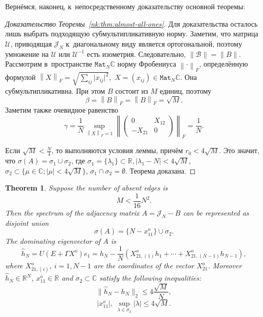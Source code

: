 \documentclass[14pt,a4paper]{extarticle}
\newtheorem{thm}{Theorem}
\theoremstyle{definition}
\begin{document}
Верн\"емся, наконец, к~непосредственному доказательству основной теоремы:
\begin{proof}[Доказательство Теоремы~\ref{nk:thm:almost-all-ones}]
    Для доказательства осталось лишь выбрать подходящую субмультипликативную норму.
    Заметим, что матрица \( \mathcal{U} \),
    приводящая \( \mathcal{J}_N \) к~диагональному виду
    является ортогональной,
    поэтому умножение на \( \mathcal{U} \) или \(\mathcal{U}^{-1}\)
    есть изометрия.
    Следовательно, \( \|\mathcal{B}\|=\|B\| \).
    Рассмотрим в~пространстве \( \mathtt{Mat}_{N}\mathbb{C} \)
    норму Фробениуса \( {\left\|\cdot\right\|}_{F} \),
    определ\"енную формулой
    \( {\left\|X\right\|}_{F} = \sqrt{\sum_{ij} \lvert x_{ij}\rvert^2}, \)
    \( X = (x_{ij})\in\mathtt{Mat}_N\mathbb{C} \).
    Она субмультипликативна.
    При этом
    \( B \) состоит из \( M \) единиц, поэтому
    \[
        \beta = {\left\|B\right\|}_{F} =
        {\left\|B\right\|}_{F} = \sqrt{M}.
        \]
    Заметим также очевидное равенство
    \[
        \gamma = \frac1N
                \sup_{{\left\|X\right\|}_{F}=1}{\left\|\begin{pmatrix}0 & X_{12} \\ -X_{21} & 0\end{pmatrix}\right\|}_{F}
                = \frac1N. \]
    
    Если
     \( \sqrt{M} < \frac{N}{4} \),
     то выполняются условия леммы,
     прич\"ем \( r_0 < 4\sqrt{M} \).
    Это значит, что
     \( \sigma(A) = \sigma_1 \cup \sigma_2 \),
     где \( \sigma_1 = \{ \lambda_1 \}\subset\mathbb{R}, \lvert \lambda_1 - N \rvert < 4\sqrt{M} \),
     \( \sigma_2 \subset \{ \mu\in\mathbb{C}; \lvert\mu\rvert < 4\sqrt{M} \} \),
     \( \sigma_1 \cap \sigma_2 = \emptyset \).
    Теорема доказана.
    \end{proof}

\begin{thm}
    Suppose the number of absent edges is
    \[ M < \frac{1}{16} N^2. \]
    Then the spectrum of the adjacency matrix \( A = \mathcal{J}_N - B \)
        can be represented as disjoint union
    \[
        \sigma(A) = \{ N - x_{11}^o \} \cup \sigma_2.
    \]
    The dominating eigenvector of \( A \) is
    \[
        \hat{h}_N = U(E+\Gamma X^o) e_1 =
            h_N - \frac1N (X_{21,(1)}^o h_1 + \cdots + X_{21, (N{-}1)}^o h_{N{-}1}),
    \]
    where \( X_{21,(i)}^o,\ i=\overline{1,N{-}1} \) are the coordinates
    of the vector \( X_{21}^o \).
    Moreover \( \hat{h}_N\in\mathbb{R}^{N} \),
    \( x_{11}^o\in\mathbb{R} \) and \( \sigma_2\subset\mathbb{C} \)
    satisfy the following inequalities:
    \[
        \|\hat{h}_N - h_N\|_2 \leq 4\frac{\sqrt{M}}{N},
    \]
    \[
        \lvert x_{11}^o \rvert,
        \ \sup_{\lambda\in\sigma_2} \lvert\lambda\rvert \leq 4\sqrt{M}.
    \]
\end{thm}
\end{document}
